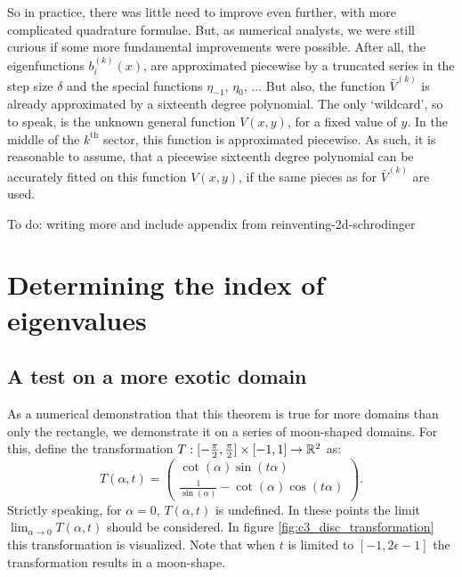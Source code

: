 So in practice, there was little need to improve even further, with more complicated quadrature formulae. But, as numerical analysts, we were still curious if some more fundamental improvements were possible. After all, the eigenfunctions $b_i^{(k)}(x)$, are approximated piecewise by a truncated series in the step size $\delta$ and the special functions $\eta_{-1}$, $\eta_{0}$, $\dots$ But also, the function $\bar{V}^{(k)}$ is already approximated by a sixteenth degree polynomial. The only `wildcard', so to speak, is the unknown general function $V(x, y)$, for a fixed value of $y$. In the middle of the $k^\text{th}$ sector, this function is approximated piecewise. As such, it is reasonable to assume, that a piecewise sixteenth degree polynomial can be accurately fitted on this function $V(x, y)$, if the same pieces as for $\bar{V}^{(k)}$ are used.


{\color{red} To do: writing more and include appendix from reinventing-2d-schrodinger}


\section{Determining the index of eigenvalues}\label{sec:c3_index_of_e}

\begin{theorem}
    \label{the:c3_counting_eigenvalues}
\end{theorem}

\subsection{A test on a more exotic domain}

As a numerical demonstration that this theorem is true for more domains than only the rectangle, we demonstrate it on a series of moon-shaped domains. For this, define the transformation $T:[-\frac{\pi}{2}, \frac{\pi}{2}] \times [-1, 1] \to \mathbb{R}^2$ as:
\begin{equation}\label{equ:c3_disc_transformation}
    T(\alpha, t) = \begin{pmatrix}
        \cot(\alpha) \sin(t \alpha) \\
        \frac{1}{\sin(\alpha)} - \cot(\alpha) \cos(t \alpha)
    \end{pmatrix}\text{.}
\end{equation}
Strictly speaking, for $\alpha = 0$,  $T(\alpha, t)$ is undefined. In these points the limit $\lim_{\alpha \to 0} T(\alpha, t)$ should be considered. In figure \ref{fig:c3_disc_transformation} this transformation is visualized. Note that when $t$ is limited to $[-1, 2\epsilon -1]$ the transformation results in a moon-shape.

